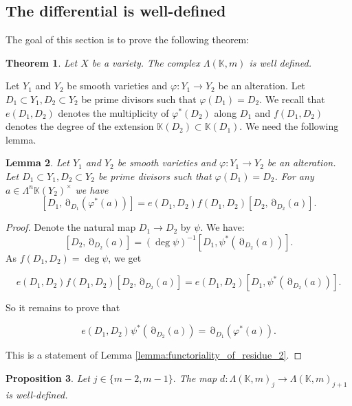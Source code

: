 \documentclass[12pt]{extarticle}
\newtheorem{theorem}{Theorem}[section]
\newtheorem{lemma}[theorem]{Lemma}
\newtheorem{proposition}[theorem]{Proposition}
\def\mb{\mathbb}
\def\L{\Lambda}
\def\k{\mb K}
\def\ph{\varphi}
\DeclareMathOperator{\ts}{\partial}
\begin{document}
\subsection{The differential is well-defined}
\label{sub:sec:Lambda+correctness}

The goal of this section is to prove the following theorem:

\begin{theorem}
\label{th:Lambda(m)_well_defined}
    Let $X$ be a variety. The complex $\L(\k, m)$ is well defined.
\end{theorem}

 Let $Y_1$ and $Y_2$ be smooth varieties and $\ph\colon Y_1\to Y_2$ be an alteration. Let $D_1\subset Y_1, D_2\subset Y_2$ be prime divisors such that $\varphi(D_1)=D_2$. We recall that $e(D_1,D_2)$ denotes the multiplicity of $\varphi^*(D_2)$ along $D_1$ and $f(D_1,D_2)$ denotes the degree of the extension $\k(D_2)\subset \k(D_1)$. We need the following lemma.

\begin{lemma}
\label{lemma:functoriality_of_residue}
    Let $Y_1$ and $Y_2$ be smooth varieties and $\ph\colon Y_1\to Y_2$ be an alteration. Let $D_1\subset Y_1, D_2\subset Y_2$ be prime divisors such that $\varphi(D_1)=D_2$. For any $a\in\Lambda^n\k(Y_2)^\times$ we have
    $$[D_1,\ts_{D_1}(\ph^*(a))]=e(D_1, D_2)f(D_1, D_2)[D_2,\ts_{D_2}(a)].$$
\end{lemma}

\begin{proof}
    Denote the natural map $D_1\to D_2$ by $\psi$. We have:
    $$[D_2,\ts_{D_2}(a)]=(\deg \psi)^{-1}[D_1, \psi^*(\ts_{D_2}(a))].$$
As $f(D_1,D_2)=\deg\psi$, we get

$$e(D_1, D_2)f(D_1, D_2)[D_2,\ts_{D_2}(a)]=e(D_1, D_2)[D_1,\psi^*(\ts_{D_2}(a))].$$

So it remains to prove that

$$e(D_1, D_2)\psi^*(\ts_{D_2}(a))=\ts_{D_1}(\ph^*(a)).$$

This is a statement of Lemma \ref{lemma:functoriality_of_residue_2}.
\end{proof}

\begin{proposition}
\label{prop:d_is_well_defined}
    Let $j\in\{m-2,m-1\}.$ The map $d\colon \L(\k,m)_j\to \L(\k, m)_{j+1}$ is well-defined. 
\end{proposition}
\end{document}
